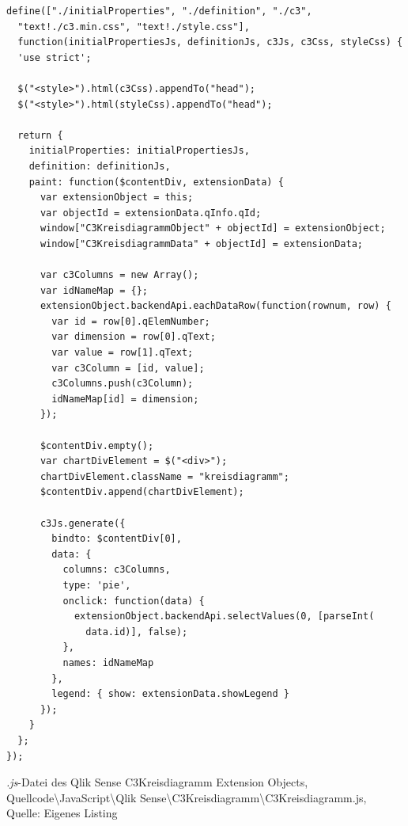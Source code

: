 \ifIncludeFigures\begin{listing}[htbp]
\begin{verbatim}
define(["./initialProperties", "./definition", "./c3",
  "text!./c3.min.css", "text!./style.css"], 
  function(initialPropertiesJs, definitionJs, c3Js, c3Css, styleCss) {
  'use strict';

  $("<style>").html(c3Css).appendTo("head");
  $("<style>").html(styleCss).appendTo("head");

  return {
    initialProperties: initialPropertiesJs,
    definition: definitionJs,
    paint: function($contentDiv, extensionData) {
      var extensionObject = this;
      var objectId = extensionData.qInfo.qId;
      window["C3KreisdiagrammObject" + objectId] = extensionObject;
      window["C3KreisdiagrammData" + objectId] = extensionData;

      var c3Columns = new Array();
      var idNameMap = {};
      extensionObject.backendApi.eachDataRow(function(rownum, row) {
        var id = row[0].qElemNumber;
        var dimension = row[0].qText;
        var value = row[1].qText;
        var c3Column = [id, value];
        c3Columns.push(c3Column);
        idNameMap[id] = dimension;
      });

      $contentDiv.empty();
      var chartDivElement = $("<div>");
      chartDivElement.className = "kreisdiagramm";
      $contentDiv.append(chartDivElement);

      c3Js.generate({
        bindto: $contentDiv[0],
        data: {
          columns: c3Columns,
          type: 'pie',
          onclick: function(data) {
            extensionObject.backendApi.selectValues(0, [parseInt(
              data.id)], false);
          },
          names: idNameMap
        },
        legend: { show: extensionData.showLegend }
      });
    }
  };
});
\end{verbatim}
\caption[\textit{.js}-Datei des Qlik Sense C3Kreisdiagramm Extension Objects ]{\textit{.js}-Datei des Qlik Sense C3Kreisdiagramm Extension Objects, \\Quellcode\textbackslash{}JavaScript\textbackslash{}Qlik Sense\textbackslash{}C3Kreisdiagramm\textbackslash{}C3Kreisdiagramm.js, \\Quelle: Eigenes Listing}
\label{lst:QlikSenseC3KreisdiagrammC3KreisdiagrammJs}
\end{listing}\fi


